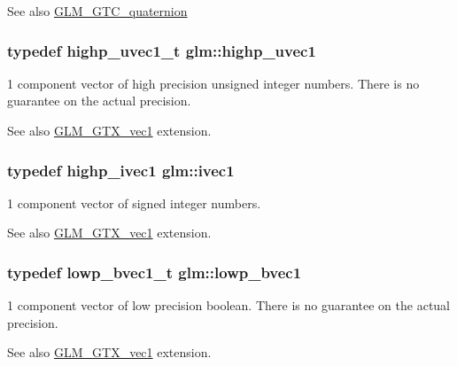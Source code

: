 \begin{DoxySeeAlso}{See also}
\hyperlink{group__gtc__quaternion}{G\+L\+M\+\_\+\+G\+T\+C\+\_\+quaternion} 
\end{DoxySeeAlso}
\subsubsection[{\texorpdfstring{highp\+\_\+uvec1}{highp_uvec1}}]{\setlength{\rightskip}{0pt plus 5cm}typedef {\bf highp\+\_\+uvec1\+\_\+t} {\bf glm\+::highp\+\_\+uvec1}}\hypertarget{namespaceglm_a2a480125ab05aa522d883651ea1101f8}{}\label{namespaceglm_a2a480125ab05aa522d883651ea1101f8}
1 component vector of high precision unsigned integer numbers. There is no guarantee on the actual precision. \begin{DoxySeeAlso}{See also}
\hyperlink{group__gtx__vec1}{G\+L\+M\+\_\+\+G\+T\+X\+\_\+vec1} extension. 
\end{DoxySeeAlso}
\subsubsection[{\texorpdfstring{ivec1}{ivec1}}]{\setlength{\rightskip}{0pt plus 5cm}typedef {\bf highp\+\_\+ivec1} {\bf glm\+::ivec1}}\hypertarget{namespaceglm_a946031cea0c22745848ebd873e6facb0}{}\label{namespaceglm_a946031cea0c22745848ebd873e6facb0}
1 component vector of signed integer numbers. \begin{DoxySeeAlso}{See also}
\hyperlink{group__gtx__vec1}{G\+L\+M\+\_\+\+G\+T\+X\+\_\+vec1} extension. 
\end{DoxySeeAlso}
\subsubsection[{\texorpdfstring{lowp\+\_\+bvec1}{lowp_bvec1}}]{\setlength{\rightskip}{0pt plus 5cm}typedef {\bf lowp\+\_\+bvec1\+\_\+t} {\bf glm\+::lowp\+\_\+bvec1}}\hypertarget{namespaceglm_af22d6a46a35bcda63801fe78c033f35f}{}\label{namespaceglm_af22d6a46a35bcda63801fe78c033f35f}
1 component vector of low precision boolean. There is no guarantee on the actual precision. \begin{DoxySeeAlso}{See also}
\hyperlink{group__gtx__vec1}{G\+L\+M\+\_\+\+G\+T\+X\+\_\+vec1} extension. 
\end{DoxySeeAlso}

